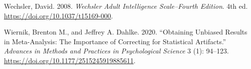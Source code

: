 \documentclass[
  letterpaper,
  DIV=11,
  numbers=noendperiod]{scrreprt}
\newlength{\cslhangindent}
\newlength{\cslentryspacingunit} %
\newenvironment{CSLReferences}[2] %
 {%
  \setlength{\parindent}{0pt}
  \ifodd #1
  \let\oldpar\par
  \def\par{\hangindent=\cslhangindent\oldpar}
  \fi
  \setlength{\parskip}{#2\cslentryspacingunit}
 }%
 {}
\begin{document}
\begin{CSLReferences}{1}{0}
\leavevmode{}%
Wechsler, David. 2008. \emph{Wechsler Adult Intelligence Scale--Fourth
Edition}. 4th ed. \url{https://doi.org/10.1037/t15169-000}.

\leavevmode{}%
Wiernik, Brenton M., and Jeffrey A. Dahlke. 2020. {``Obtaining Unbiased
Results in Meta-Analysis: The Importance of Correcting for Statistical
Artifacts.''} \emph{Advances in Methods and Practices in Psychological
Science} 3 (1): 94--123. \url{https://doi.org/10.1177/2515245919885611}.

\end{CSLReferences}
\end{document}

